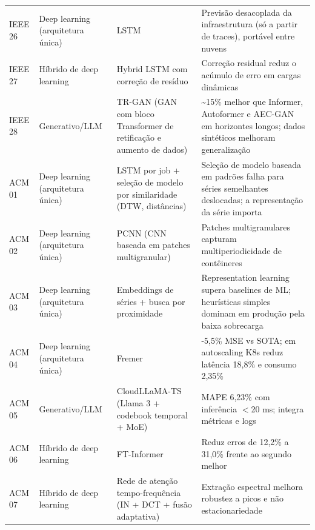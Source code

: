 {\begin{longtable}{p{1.3cm}p{2.6cm}p{5.0cm}p{5.9cm}}
IEEE 26 & Deep learning (arquitetura única) & LSTM & Previsão desacoplada da infraestrutura (só a partir de traces), portável entre nuvens \\
IEEE 27 & Híbrido de deep learning & Hybrid LSTM com correção de resíduo & Correção residual reduz o acúmulo de erro em cargas dinâmicas \\
IEEE 28 & Generativo/LLM & TR-GAN (GAN com bloco Transformer de retificação e aumento de dados) & \textasciitilde{}15\% melhor que Informer, Autoformer e AEC-GAN em horizontes longos; dados sintéticos melhoram generalização \\
ACM 01 & Deep learning (arquitetura única) & LSTM por job + seleção de modelo por similaridade (DTW, distâncias) & Seleção de modelo baseada em padrões falha para séries semelhantes deslocadas; a representação da série importa \\
ACM 02 & Deep learning (arquitetura única) & PCNN (CNN baseada em patches multigranular) & Patches multigranulares capturam multiperiodicidade de contêineres \\
ACM 03 & Deep learning (arquitetura única) & Embeddings de séries + busca por proximidade & Representation learning supera baselines de ML; heurísticas simples dominam em produção pela baixa sobrecarga \\
ACM 04 & Deep learning (arquitetura única) & Fremer & -5,5\% MSE vs SOTA; em autoscaling K8s reduz latência 18,8\% e consumo 2,35\% \\
ACM 05 & Generativo/LLM & CloudLLaMA-TS (Llama 3 + codebook temporal + MoE) & MAPE 6,23\% com inferência $<$20 ms; integra métricas e logs \\
ACM 06 & Híbrido de deep learning & FT-Informer & Reduz erros de 12,2\% a 31,0\% frente ao segundo melhor \\
ACM 07 & Híbrido de deep learning & Rede de atenção tempo-frequência (IN + DCT + fusão adaptativa) & Extração espectral melhora robustez a picos e não estacionariedade \\
\end{longtable}
}
